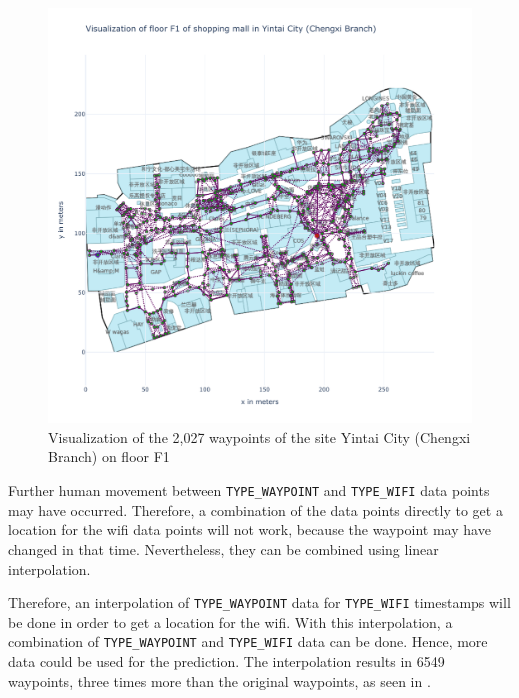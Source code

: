 \begin{figure}[h!]
    \centering
    \includegraphics[scale=0.6]{images/whole_floor_visualization_wo_interpolated.pdf}
    \caption{Visualization of the 2,027 waypoints of the site Yintai City (Chengxi Branch) on floor F1}
    \label{fig:vis-wo-interpolated}
\end{figure}

Further human movement between \texttt{TYPE\_WAYPOINT} and \texttt{TYPE\_WIFI} data points may have occurred.
Therefore, a combination of the data points directly to get a location for the \ac{wifi} data points will not work, because the waypoint may have changed in that time.
Nevertheless, they can be combined using linear interpolation.%

%     

Therefore, an interpolation of \texttt{TYPE\_WAYPOINT} data for \texttt{TYPE\_WIFI} timestamps will be done in order to get a location for the \ac{wifi}.
With this interpolation, a combination of \texttt{TYPE\_WAYPOINT} and \texttt{TYPE\_WIFI} data can be done.
Hence, more data could be used for the prediction.
The interpolation results in 6549 waypoints, three times more than the original waypoints, as seen in .

